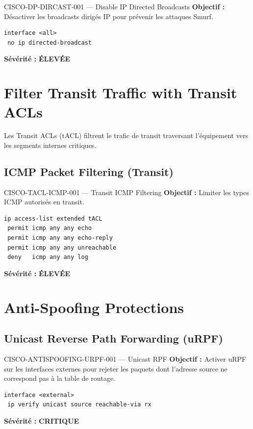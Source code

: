 \documentclass[12pt, a4paper]{report}
\begin{document}
\begin{rulebox}{CISCO-DP-DIRCAST-001 — Disable IP Directed Broadcasts}
  \textbf{Objectif :} Désactiver les broadcasts dirigés IP pour prévenir les attaques Smurf.

  \begin{lstlisting}
interface <all>
 no ip directed-broadcast
  \end{lstlisting}

  \textbf{Sévérité :} \textcolor{accentOrange}{\textbf{ÉLEVÉE}}
\end{rulebox}

\section{Filter Transit Traffic with Transit ACLs}

Les Transit ACLs (tACL) filtrent le trafic de transit traversant l'équipement vers les segments internes critiques.

\subsection{ICMP Packet Filtering (Transit)}

\begin{rulebox}{CISCO-TACL-ICMP-001 — Transit ICMP Filtering}
  \textbf{Objectif :} Limiter les types ICMP autorisés en transit.

  \begin{lstlisting}
ip access-list extended tACL
 permit icmp any any echo
 permit icmp any any echo-reply
 permit icmp any any unreachable
 deny   icmp any any log
  \end{lstlisting}

  \textbf{Sévérité :} \textcolor{accentOrange}{\textbf{ÉLEVÉE}}
\end{rulebox}

\section{Anti-Spoofing Protections}

\subsection{Unicast Reverse Path Forwarding (uRPF)}

\begin{rulebox}{CISCO-ANTISPOOFING-URPF-001 — Unicast RPF}
  \textbf{Objectif :} Activer uRPF sur les interfaces externes pour rejeter les paquets dont l'adresse source ne correspond pas à la table de routage.

  \begin{lstlisting}
interface <external>
 ip verify unicast source reachable-via rx
  \end{lstlisting}

  \textbf{Sévérité :} \textcolor{accentRed}{\textbf{CRITIQUE}}
\end{rulebox}
\end{document}
